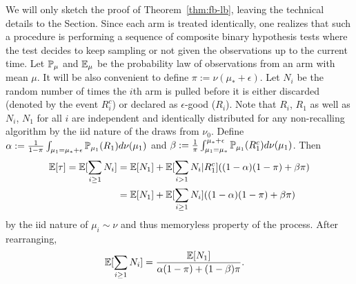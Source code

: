 We will only sketch the proof of Theorem~\ref{thm:fb-lb}, leaving the technical details to the Section.
Since each arm is treated identically, one realizes that such a procedure is performing a sequence of composite binary hypothesis tests where the test decides to keep sampling or not given the observations up to the current time.
Let $\P_\mu$ and $\E_\mu$ be the probability law of observations from an arm with mean $\mu$.
It will be also convenient to define $\pi:=\nu(\mu_*+\epsilon)$.
Let $N_i$ be the random number of times the $i$th arm is pulled before it is either discarded (denoted by the event $R_i^c$) or declared as $\epsilon$-good ($R_i$). 
Note that $R_i$, $R_1$ as well as $N_i$, $N_1$ for all $i$ are independent and identically distributed for any non-recalling algorithm by the iid nature of the draws from $\nu_0$.
Define $\alpha := \frac{1}{1-\pi} \int_{\mu_1 = \mu_* + \epsilon} \P_{\mu_1}(R_1) d\nu(\mu_1)$ and $\beta := \frac{1}{\pi} \int_{\mu_1 = \mu_*}^{\mu_* + \epsilon} \P_{\mu_1}(R_1^c) d\nu(\mu_1)$.
Then
\begin{align*}
\E[\tau] = \E[ \sum_{i \geq 1} N_i ]
 &= \E[N_1] + \E[\sum_{i > 1} N_i | R_1^c] ( (1-\alpha) (1-\pi) + \beta \pi) \\
&= \E[N_1] + \E[\sum_{i \geq 1} N_i ] ( (1-\alpha) (1-\pi) + \beta \pi) 
\end{align*}
by the iid nature of $\mu_i \sim \nu$ and thus memoryless property of the process.
After rearranging,
\begin{align}
\E[ \sum_{i \geq 1} N_i ] &= \frac{\E[N_1]}{\alpha (1-\pi) + (1-\beta) \pi}. \label{eqn:N1_to_many}
\end{align}

